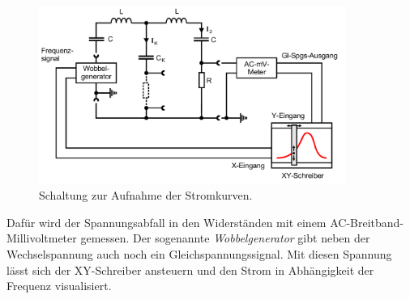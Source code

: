 \begin{figure} 
    \centering
    \includegraphics[width=10cm] {pictures/stromkurven.png} 
    \caption{Schaltung zur Aufnahme der Stromkurven. \cite{v355}}
    \label{fig:stromkurven}
\end{figure} 

Dafür wird der Spannungsabfall in den Widerständen mit einem AC-Breitband-Millivoltmeter gemessen.
Der sogenannte \textit{Wobbelgenerator} gibt neben der Wechselspannung auch noch ein Gleichspannungssignal.
Mit diesen Spannung lässt sich der XY-Schreiber ansteuern und  den Strom in Abhängigkeit der Frequenz visualisiert.
